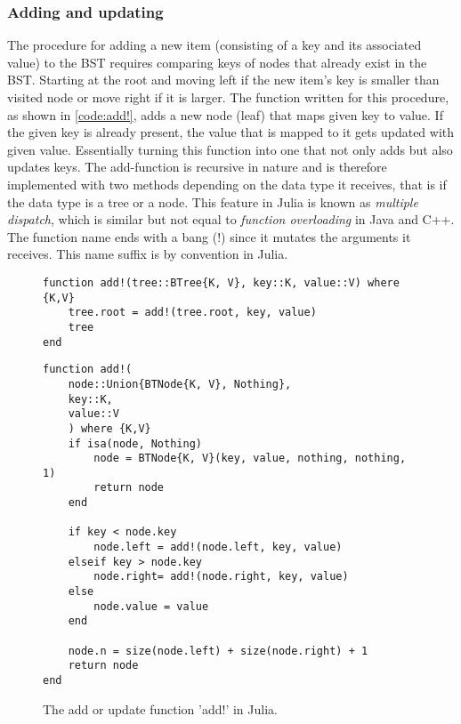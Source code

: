 \documentclass[a4paper, 11pt]{article}
\begin{document}
    \subsubsection*{Adding and updating}
    \label{sec:adding}
    The procedure for adding a new item (consisting of a key and its associated value)
    to the BST requires comparing keys of
    nodes that already exist in the BST. Starting at the root and moving left
    if the new item's key is smaller than visited node or move right if it is larger. 
    The function written for this procedure, as shown in 
    \autoref{code:add!}, adds a new node (leaf) that maps
    given key to value. If the given key is already present, the value that is
    mapped to it gets updated with given value. Essentially turning this function into
    one that not only adds but also updates keys. 
    The add-function is recursive in nature and is therefore implemented with 
    two methods %
    depending on the data type it receives, 
    that is if the data type is a tree or a node. 
    This feature in Julia is known as \emph{multiple dispatch}, 
    which is similar but not equal to \emph{function overloading} in Java and C++. 
    The function name ends with a bang (!) since it mutates the arguments it receives. 
    This name suffix is by convention in Julia. 
    \begin{figure}[H]
        \centering
    \begin{verbatim}
function add!(tree::BTree{K, V}, key::K, value::V) where {K,V}
    tree.root = add!(tree.root, key, value)
    tree
end
    \end{verbatim}
    \begin{verbatim}
function add!(
    node::Union{BTNode{K, V}, Nothing}, 
    key::K, 
    value::V
    ) where {K,V}
    if isa(node, Nothing)  
        node = BTNode{K, V}(key, value, nothing, nothing, 1)
        return node
    end

    if key < node.key
        node.left = add!(node.left, key, value)
    elseif key > node.key
        node.right= add!(node.right, key, value)
    else
        node.value = value
    end

    node.n = size(node.left) + size(node.right) + 1
    return node
end
    \end{verbatim}
    \caption{The add or update function 'add!' in Julia.}
    \label{code:add!}
    \end{figure}
\end{document}
